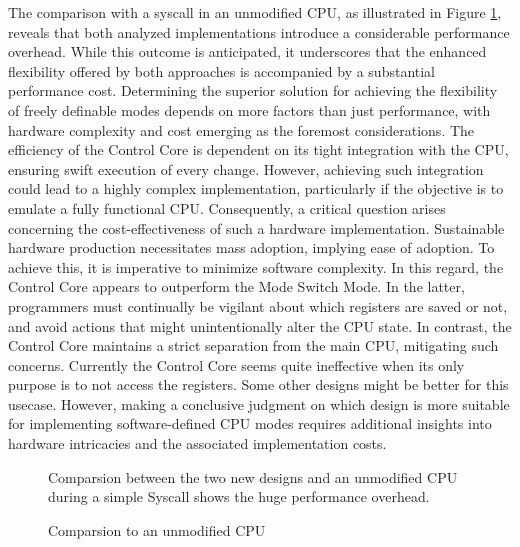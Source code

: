 The comparison with a syscall in an unmodified CPU, as illustrated in Figure \ref{fig:unmod_cpu},
reveals that both analyzed implementations introduce a considerable performance
overhead. While this outcome is anticipated, it underscores that the enhanced
flexibility offered by both approaches is accompanied by a substantial
performance cost. Determining the
superior solution for achieving the flexibility of freely definable modes depends
on more factors than just performance, with hardware complexity and cost
emerging as the foremost considerations. The efficiency of the Control Core is
dependent on its tight integration with the CPU, ensuring swift execution of
every change. However, achieving such integration could lead to a highly
complex implementation, particularly if the objective is to emulate a fully
functional CPU. Consequently, a critical question arises concerning the
cost-effectiveness of such a hardware implementation. 
Sustainable hardware production necessitates mass adoption, implying
ease of adoption. To achieve this, it is imperative to minimize software
complexity. In this regard, the Control Core appears to outperform the Mode
Switch Mode. In the latter, programmers must continually be vigilant about which
registers are saved or not, and avoid actions that might unintentionally alter
the CPU state. In contrast, the Control Core maintains a strict separation from
the main CPU, mitigating such concerns. Currently the Control Core seems quite
ineffective when its only purpose is to not access the registers. Some other
designs might be better for this usecase. However, making a conclusive judgment on
which design is more suitable for implementing software-defined CPU modes
requires additional insights into hardware intricacies and the associated
implementation costs.

\begin{figure}[h]
    \centering
    
    \captionsetup{justification=centering}
    \caption{Comparsion to an unmodified CPU}
        Comparsion between the two new designs and an unmodified CPU during a
        simple Syscall shows the huge performance overhead.
    \label{fig:unmod_cpu}
\end{figure}


